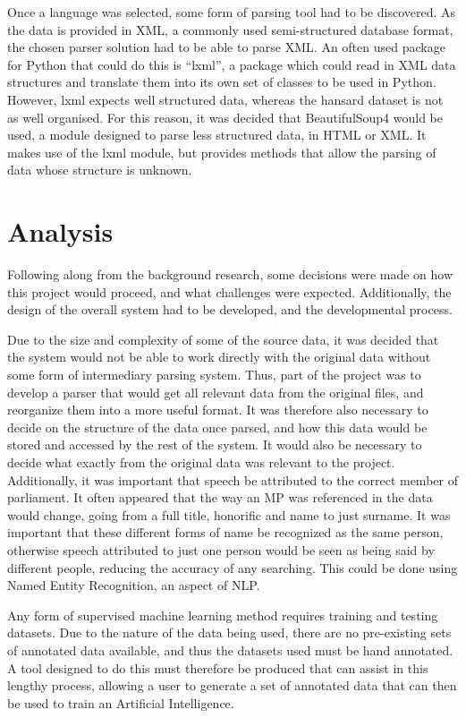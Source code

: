Once a language was selected, some form of parsing tool had to be discovered. As the data is provided in XML, a commonly used semi-structured database format, the chosen parser solution had to be able to parse XML. An often used package for Python that could do this is “lxml”, a package which could read in XML data structures and translate them into its own set of classes to be used in Python. However, lxml expects well structured data, whereas the hansard dataset is not as well organised. For this reason, it was decided that BeautifulSoup4\cite{Richardson} would be used, a module designed to parse less structured data, in HTML or XML. It makes use of the lxml module, but provides methods that allow the parsing of data whose structure is unknown.

\section{Analysis}
\label{sec:bck_analysis}
Following along from the background research, some decisions were made on how this project would proceed, and what challenges were expected. Additionally, the design of the overall system had to be developed, and the developmental process.

Due to the size and complexity of some of the source data, it was decided that the system would not be able to work directly with the original data without some form of intermediary parsing system. Thus, part of the project was to develop a parser that would get all relevant data from the original files, and reorganize them into a more useful format. It was therefore also necessary to decide on the structure of the data once parsed, and how this data would be stored and accessed by the rest of the system. It would also be necessary to decide what exactly from the original data was relevant to the project.
Additionally, it was important that speech be attributed to the correct member of parliament. It often appeared that the way an MP was referenced in the data would change, going from a full title, honorific and name to just surname. It was important that these different forms of name be recognized as the same person, otherwise speech attributed to just one person would be seen as being said by different people, reducing the accuracy of any searching. This could be done using Named Entity Recognition, an aspect of NLP.

Any form of supervised machine learning method requires training and testing datasets. Due to the nature of the data being used, there are no pre-existing sets of annotated data available, and thus the datasets used must be hand annotated. A tool designed to do this must therefore be produced that can assist in this lengthy process, allowing a user to generate a set of annotated data that can then be used to train an Artificial Intelligence.

